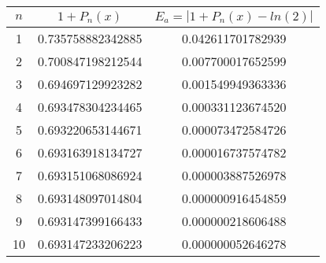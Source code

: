 \documentclass[11pt]{article}
\begin{document}
\begin{exercise}{3}
{        \begin{center}
            \begin{tabular}{|c|c|c|}
                \hline
                $n$ &  $1 + P_n(x)$       &  $E_a = | 1 + P_n(x) - ln(2) |$     \\ \hline
                1   &  0.735758882342885  &  0.042611701782939                  \\ \hline
                2   &  0.700847198212544  &  0.007700017652599                  \\ \hline
                3   &  0.694697129923282  &  0.001549949363336                  \\ \hline
                4   &  0.693478304234465  &  0.000331123674520                  \\ \hline
                5   &  0.693220653144671  &  0.000073472584726                  \\ \hline
                6   &  0.693163918134727  &  0.000016737574782                  \\ \hline
                7   &  0.693151068086924  &  0.000003887526978                  \\ \hline
                8   &  0.693148097014804  &  0.000000916454859                  \\ \hline
                9   &  0.693147399166433  &  0.000000218606488                  \\ \hline
                10  &  0.693147233206223  &  0.000000052646278                  \\ \hline
            \end{tabular}
        \end{center}
    }
\end{exercise}
\end{document}
